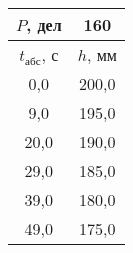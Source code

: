\begin{tabular}[t]{|c|c|}
\hline
$P$, дел & 160 \\
\hline
$t_{абс}$, с & $h$, мм \\ 
\hline
0,0 & 200,0 \\ 
9,0 & 195,0 \\ 
20,0 & 190,0 \\ 
29,0 & 185,0 \\ 
39,0 & 180,0 \\ 
49,0 & 175,0 \\ 
\hline
\end{tabular}